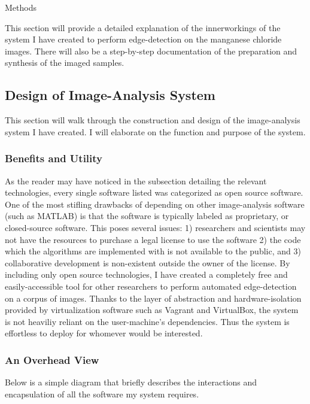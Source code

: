 \documentclass[a4paper,12pt]{article}
\begin{document}
\newpage
\begin{section}{Methods}

This section will provide a detailed explanation of the innerworkings of the system I have created to perform edge-detection on the manganese chloride images. There will also be a step-by-step documentation of the preparation and synthesis of the imaged samples.


\subsection{Design of Image-Analysis System}

This section will walk through the construction and design of the image-analysis system I have created. I will elaborate on the function and purpose of the system.

\subsubsection{Benefits and Utility}

As the reader may have noticed in the subsection detailing the relevant technologies, every single software listed was categorized as open source software. One of the most stifling drawbacks of depending on other image-analysis software (such as MATLAB) is that the software is typically labeled as proprietary, or closed-source software. This poses several issues: 1) researchers and scientists may not have the resources to purchase a legal license to use the software 2) the code which the algorithms are implemented with is not available to the public, and 3) collaborative development is non-existent outside the owner of the license. By including only open source technologies, I have created a completely free and easily-accessible tool for other researchers to perform automated edge-detection on a corpus of images. Thanks to the layer of abstraction and hardware-isolation provided by virtualization software such as Vagrant and VirtualBox, the system is not heaviliy reliant on the user-machine's dependencies. Thus the system is effortless to deploy for whomever would be interested. 

\subsubsection{An Overhead View}

Below is a simple diagram that briefly describes the interactions and encapsulation of all the software my system requires.


\end{section}
\end{document}
